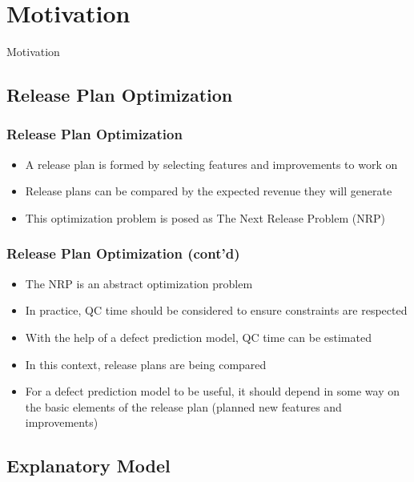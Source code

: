 \documentclass[presentation]{beamer}
\begin{document}
\section{Motivation}

\begin{frame}
\begin{center}
\Large{Motivation}
\end{center}
\end{frame}

\subsection{Release Plan Optimization}

\begin{frame}[t]
\frametitle{Release Plan Optimization}
\begin{itemize}
  \item{A release plan is formed by selecting features and improvements to work on}
  \item{Release plans can be compared by the expected revenue they will generate}
  \item{This optimization problem is posed as The Next Release Problem (NRP)}
\end{itemize}
\end{frame}

\begin{frame}[t]
\frametitle{Release Plan Optimization (cont'd)}
\begin{itemize}
  \item{The NRP is an abstract optimization problem}
  \item{In practice, QC time should be considered to ensure constraints are respected}
  \item{With the help of a defect prediction model, QC time can be estimated}
  \item{In this context, release plans are being compared}
  \item{For a defect prediction model to be useful, it should depend in some way on the basic elements of the release plan (planned new features and improvements)}
\end{itemize}
\end{frame}

\subsection{Explanatory Model}
\end{document}

